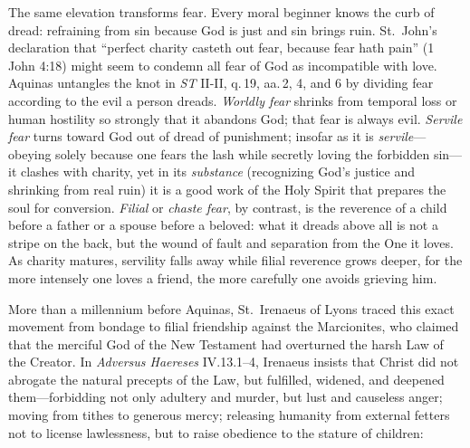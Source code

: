 The same elevation transforms fear. Every moral beginner knows the curb of dread: refraining from sin because God is just and sin brings ruin. St.\ John's declaration that ``perfect charity casteth out fear, because fear hath pain'' (1 John 4:18) might seem to condemn all fear of God as incompatible with love. Aquinas untangles the knot in \emph{ST} II-II, q.\,19, aa.\,2, 4, and 6 by dividing fear according to the evil a person dreads. \emph{Worldly fear} shrinks from temporal loss or human hostility so strongly that it abandons God; that fear is always evil. \emph{Servile fear} turns toward God out of dread of punishment; insofar as it is \emph{servile}---obeying solely because one fears the lash while secretly loving the forbidden sin---it clashes with charity, yet in its \emph{substance} (recognizing God's justice and shrinking from real ruin) it is a good work of the Holy Spirit that prepares the soul for conversion. \emph{Filial} or \emph{chaste fear}, by contrast, is the reverence of a child before a father or a spouse before a beloved: what it dreads above all is not a stripe on the back, but the wound of fault and separation from the One it loves. As charity matures, servility falls away while filial reverence grows deeper, for the more intensely one loves a friend, the more carefully one avoids grieving him.

More than a millennium before Aquinas, St.\ Irenaeus of Lyons traced this exact movement from bondage to filial friendship against the Marcionites, who claimed that the merciful God of the New Testament had overturned the harsh Law of the Creator. In \emph{Adversus Haereses} IV.13.1--4, Irenaeus insists that Christ did not abrogate the natural precepts of the Law, but fulfilled, widened, and deepened them---forbidding not only adultery and murder, but lust and causeless anger; moving from tithes to generous mercy; releasing humanity from external fetters not to license lawlessness, but to raise obedience to the stature of children:

